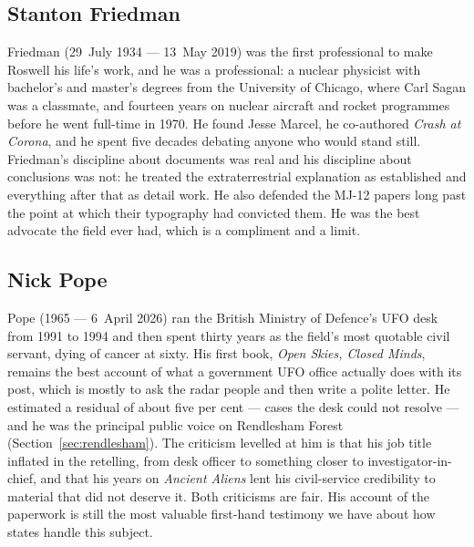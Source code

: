 \subsection{Stanton Friedman}

Friedman (29~July 1934 --- 13~May 2019) was the first professional to make
Roswell his life's work, and he was a professional: a nuclear physicist with bachelor's
and master's degrees from the University of Chicago, where Carl Sagan was a classmate, and
fourteen years on nuclear aircraft and rocket programmes before he went full-time in 1970.
He found Jesse Marcel, he co-authored \emph{Crash at Corona}, and he spent five decades
debating anyone who would stand still. Friedman's discipline about documents was real and
his discipline about conclusions was not: he treated the extraterrestrial explanation as
established and everything after that as detail work. He also defended the MJ-12 papers
long past the point at which their typography had convicted them. He was the best advocate
the field ever had, which is a compliment and a limit.

\subsection{Nick Pope}

Pope (1965 --- 6~April 2026) ran the British Ministry of Defence's UFO desk
from 1991 to 1994 and then spent thirty years as the field's most quotable civil servant,
dying of cancer at sixty. His first book, \emph{Open Skies, Closed Minds}, remains the best
account of what a government UFO office actually does with its post, which is mostly to
ask the radar people and then write a polite letter. He estimated a residual of about five
per cent --- cases the desk could not resolve --- and he was the principal public voice on
Rendlesham Forest (Section~\ref{sec:rendlesham}). The criticism levelled at him is that
his job title inflated in the retelling, from desk officer to something closer to
investigator-in-chief, and that his years on \emph{Ancient Aliens} lent his civil-service
credibility to material that did not deserve it. Both criticisms are fair. His account of
the paperwork is still the most valuable first-hand testimony we have about how states
handle this subject.


